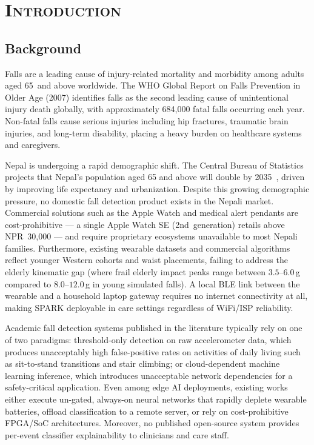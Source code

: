 
\chapter{\scshape Introduction}

\section{Background}

Falls are a leading cause of injury-related mortality and morbidity among adults aged 65~and above worldwide. The WHO Global Report on Falls Prevention in Older Age (2007) identifies falls as the second leading cause of unintentional injury death globally, with approximately 684,000 fatal falls occurring each year\cite{who2007falls}. Non-fatal falls cause serious injuries including hip fractures, traumatic brain injuries, and long-term disability, placing a heavy burden on healthcare systems and caregivers.

Nepal is undergoing a rapid demographic shift. The Central Bureau of Statistics projects that Nepal's population aged 65 and above will double by 2035~\cite{cbs2021nepal}, driven by improving life expectancy and urbanization. Despite this growing demographic pressure, no domestic fall detection product exists in the Nepali market. Commercial solutions such as the Apple Watch and medical alert pendants are cost-prohibitive --- a single Apple Watch SE (2nd~generation) retails above NPR~30,000 --- and require proprietary ecosystems unavailable to most Nepali families. Furthermore, existing wearable datasets and commercial algorithms reflect younger Western cohorts and waist placements, failing to address the elderly kinematic gap (where frail elderly impact peaks range between $3.5\text{--}6.0$\,g compared to $8.0\text{--}12.0$\,g in young simulated falls). A local BLE link between the wearable and a household laptop gateway requires no internet connectivity at all, making SPARK deployable in care settings regardless of WiFi/ISP reliability.

Academic fall detection systems published in the literature typically rely on one of two paradigms: threshold-only detection on raw accelerometer data, which produces unacceptably high false-positive rates on activities of daily living such as sit-to-stand transitions and stair climbing; or cloud-dependent machine learning inference, which introduces unacceptable network dependencies for a safety-critical application. Even among edge AI deployments, existing works either execute un-gated, always-on neural networks that rapidly deplete wearable batteries, offload classification to a remote server, or rely on cost-prohibitive FPGA/SoC architectures. Moreover, no published open-source system provides per-event classifier explainability to clinicians and care staff.

